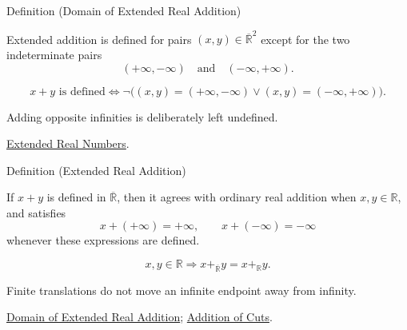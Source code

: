 \begin{definitionbox}{Definition (Domain of Extended Real Addition)}
\begin{definition}
\label{def:extended-real-addition-domain}
Extended addition is defined for pairs $(x,y)\in\overline{\mathbb{R}}^2$
except for the two indeterminate pairs
\[
(+\infty,-\infty)
\quad\text{and}\quad
(-\infty,+\infty).
\]
\end{definition}
\end{definitionbox}
\begin{remark*}
\[
x+y\text{ is defined}
\Longleftrightarrow
\neg\bigl((x,y)=(+\infty,-\infty)\lor(x,y)=(-\infty,+\infty)\bigr).
\]
\end{remark*}
\begin{remark*}[Interpretation]
Adding opposite infinities is deliberately left undefined.
\end{remark*}
\begin{dependencies}
\hyperref[def:extended-real-numbers]{Extended Real Numbers}.
\end{dependencies}

\begin{definitionbox}{Definition (Extended Real Addition)}
\begin{definition}
\label{def:extended-real-addition}
If $x+y$ is defined in $\overline{\mathbb{R}}$, then it agrees with ordinary
real addition when $x,y\in\mathbb{R}$, and satisfies
\[
x+(+\infty)=+\infty,\qquad x+(-\infty)=-\infty
\]
whenever these expressions are defined.
\end{definition}
\end{definitionbox}
\begin{remark*}
\[
x,y\in\mathbb{R}\Rightarrow
x+_{\overline{\mathbb{R}}}y=x+_{\mathbb{R}}y.
\]
\end{remark*}
\begin{remark*}[Interpretation]
Finite translations do not move an infinite endpoint away from infinity.
\end{remark*}
\begin{dependencies}
\hyperref[def:extended-real-addition-domain]{Domain of Extended Real Addition};
\hyperref[def:addition-on-r]{Addition of Cuts}.
\end{dependencies}

